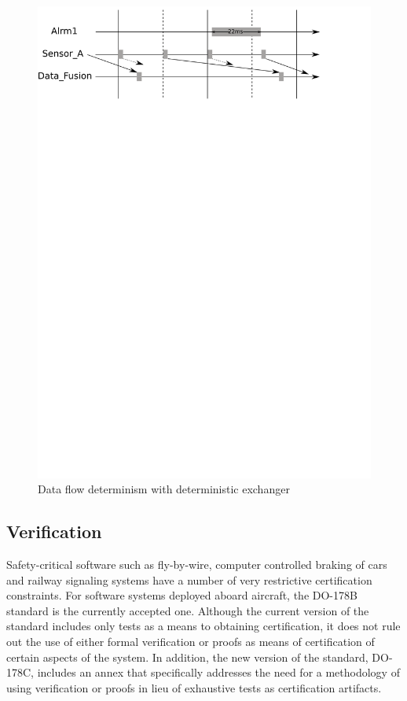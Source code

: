 \begin{figure}
\includegraphics[scale=0.75]{figs/control_simple_nobreach}
\caption{Data flow determinism with deterministic exchanger}
\label{fig:det_no_breach}
\end{figure}

\subsection{Verification}
\label{sec:verif}
Safety-critical software such as fly-by-wire, computer controlled
braking of cars and railway signaling systems have a number of very
restrictive certification constraints. For software systems deployed
aboard aircraft, the DO-178B standard is the currently accepted
one. Although the current version of the standard includes only tests
as a means to obtaining certification, it does not rule out the use of
either formal verification or proofs as means of certification of
certain aspects of the system. In addition, the new version of the
standard, DO-178C, includes an annex that specifically addresses the
need for a methodology of using verification or proofs in lieu of
exhaustive tests as certification artifacts.

